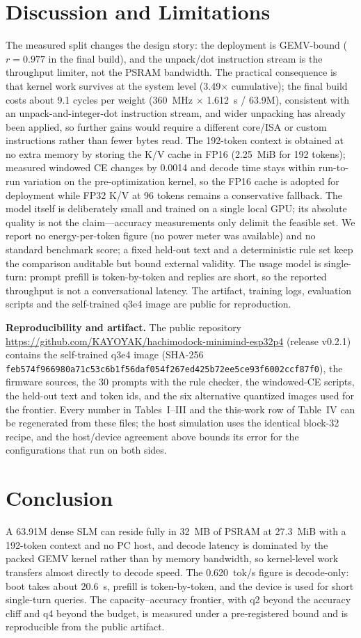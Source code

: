 \documentclass[journal,letterpaper]{IEEEtran}
\begin{document}
\section{Discussion and Limitations}
The measured split changes the design story: the deployment is GEMV-bound ($r=0.977$ in the
final build), and the unpack/dot instruction stream is the throughput limiter, not the PSRAM
bandwidth. The practical consequence is that kernel work survives at the system level
(3.49$\times$ cumulative); the final build costs about 9.1 cycles per weight
(360~MHz $\times$ 1.612~s / 63.9M), consistent with an unpack-and-integer-dot instruction
stream, and wider unpacking has already been applied, so further gains would require a
different core/ISA or custom instructions rather than fewer bytes read. The 192-token context is obtained at no extra memory by storing the K/V cache in FP16
(2.25~MiB for 192 tokens); measured windowed CE changes by 0.0014 and decode time stays within run-to-run variation on
the pre-optimization kernel, so the FP16 cache is adopted for deployment while FP32 K/V at 96
tokens remains a conservative fallback. The model itself is deliberately small and trained on a single local GPU; its absolute
quality is not the claim---accuracy measurements only delimit the feasible set. We report no
energy-per-token figure (no power meter was available) and no standard benchmark score; a fixed
held-out text and a deterministic rule set keep the comparison auditable but bound external
validity. The usage model is single-turn: prompt prefill is token-by-token and replies are
short, so the reported throughput is not a conversational latency. The artifact,
training logs, evaluation scripts and the self-trained q3e4 image are public for reproduction.

\textbf{Reproducibility and artifact.} The public repository
\url{https://github.com/KAYOYAK/hachimodock-minimind-esp32p4} (release v0.2.1) contains the
self-trained q3e4 image (SHA-256
\texttt{feb574f966980a71c53c6b1f56daf054f}\allowbreak\texttt{267ed425b72ee5ce93f6002ccf87f0}), the firmware
sources, the 30 prompts with the rule checker, the windowed-CE scripts, the held-out text and
token ids, and the six alternative quantized images used for the frontier. Every number in
Tables~I--III and the this-work row of Table~IV can be regenerated from these files; the host
simulation uses the identical block-32 recipe, and the host/device agreement above bounds its
error for the configurations that run on both sides.

\section{Conclusion}
A 63.91M dense SLM can reside fully in 32~MB of PSRAM at 27.3~MiB with a 192-token context and
no PC host, and decode latency is dominated by the packed GEMV kernel rather than by memory
bandwidth, so kernel-level work transfers almost directly to decode speed. The 0.620~tok/s
figure is decode-only: boot takes about 20.6~s, prefill is token-by-token, and the device is
used for short single-turn queries. The capacity--accuracy frontier, with q2 beyond the accuracy
cliff and q4 beyond the budget, is measured under a pre-registered bound and is reproducible
from the public artifact.
\end{document}
